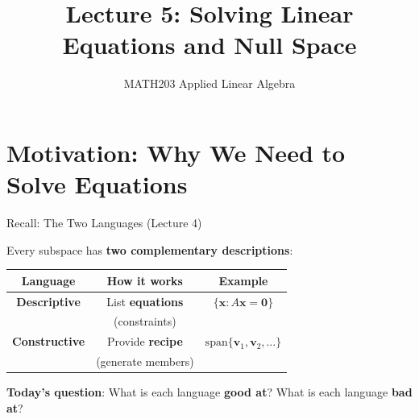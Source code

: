 \documentclass[10pt]{beamer}
\title{Lecture 5: Solving Linear Equations and Null Space}
\subtitle{MATH203 Applied Linear Algebra}
\date{}
\theoremstyle{definition}
\newcommand{\x}[1]{\alert{\textbf{#1}}}
\begin{document}
\maketitle

\section{Motivation: Why We Need to Solve Equations}

\begin{frame}{Recall: The Two Languages (Lecture 4)}

Every subspace has \x{two complementary descriptions}:

\vspace{1em}

\begin{center}
\begin{tabular}{|c|c|c|}
\hline
\textbf{Language} & \textbf{How it works} & \textbf{Example} \\
\hline
\x{Descriptive} & List \textbf{equations} & $\{\mathbf{x} : A\mathbf{x} = \mathbf{0}\}$ \\
 & (constraints) & \\
\hline
\x{Constructive} & Provide \textbf{recipe} & $\text{span}\{\mathbf{v}_1, \mathbf{v}_2, \ldots\}$ \\
 & (generate members) & \\
\hline
\end{tabular}
\end{center}

\vspace{1em}

\x{Today's question}: What is each language \textbf{good at}? What is each language \textbf{bad at}?

\end{frame}
\end{document}

